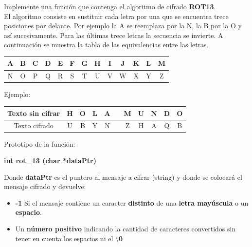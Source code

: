 \documentclass[12pt]{article} %
\begin{document}
Implemente una función que contenga el algoritmo de cifrado {\bf ROT13}. \\
El algoritmo consiste en sustituir cada letra por una que se encuentra trece posiciones por delante. Por ejemplo la A se reemplaza por la N, la B por la O y así sucesivamente. Para las últimas trece letras la secuencia se invierte. A continuación se muestra la tabla de las equivalencias entre las letras.
\noindent
  \begin{center}
   \begin{tabular}{| c | c | c | c | c | c | c | c | c | c | c | c | c |}
    \hline
     A & B & C & D & E & F & G & H & I & J & K & L & M \\ \hline 
     N & O & P & Q & R & S & T & U & V & W & X & Y & Z \\ \hline 
   \end{tabular}	
  \end{center}
Ejemplo:
\noindent
\vspace{-0.6cm}
  \begin{center}
   \begin{tabular}{| c | c | c | c | c | c | c | c | c | c | c |}
    \hline
     Texto sin cifrar & H & O & L & A &   & M & U & N & D & O  \\ \hline 
     Texto cifrado    & U & B & Y & N &   & Z & H & A & Q & B  \\ \hline 
   \end{tabular}	
  \end{center}
Prototipo de la función:
\begin{center}
{\bf int rot\_13 (char *dataPtr)}
\end{center}
Donde {\bf dataPtr} es el puntero al mensaje a cifrar (string) y donde se colocará el mensaje cifrado y devuelve:
\begin{itemize}
\item {\bf -1} Si el mensaje contiene un caracter {\bf distinto} de una {\bf letra mayúscula} o un {\bf espacio}.
\item Un {\bf número positivo} indicando la cantidad de caracteres convertidos sin tener en 
cuenta los espacios ni el {\bf $\setminus$0}
\end{itemize}




 
\end{document}
